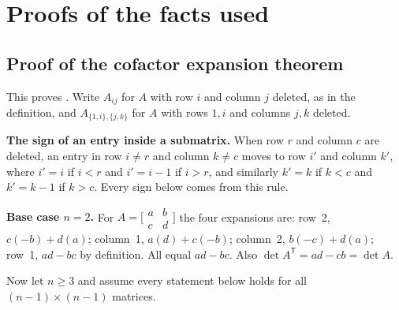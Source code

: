 \documentclass[10pt]{scrartcl}
\begin{document}
\section{Proofs of the facts used}

\subsection{Proof of the cofactor expansion theorem}
This proves . Write $A_{ij}$ for $A$ with row $i$ and column $j$ deleted, as in the definition, and $A_{\{1,i\},\{j,k\}}$ for $A$ with rows $1,i$ and columns $j,k$ deleted.

\textbf{The sign of an entry inside a submatrix.} When row $r$ and column $c$ are deleted, an entry in row $i\ne r$ and column $k\ne c$ moves to row $i'$ and column $k'$, where $i'=i$ if $i<r$ and $i'=i-1$ if $i>r$, and similarly $k'=k$ if $k<c$ and $k'=k-1$ if $k>c$. Every sign below comes from this rule.

\textbf{Base case $n=2$.} For $A=\bigl[\begin{smallmatrix}a&b\\c&d\end{smallmatrix}\bigr]$ the four expansions are: row~2, $c(-b)+d(a)$; column~1, $a(d)+c(-b)$; column~2, $b(-c)+d(a)$; row~1, $ad-bc$ by definition. All equal $ad-bc$. Also $\det A^{\mathsf T}=ad-cb=\det A$.

Now let $n\ge3$ and assume every statement below holds for all $(n-1)\times(n-1)$ matrices.
\end{document}
